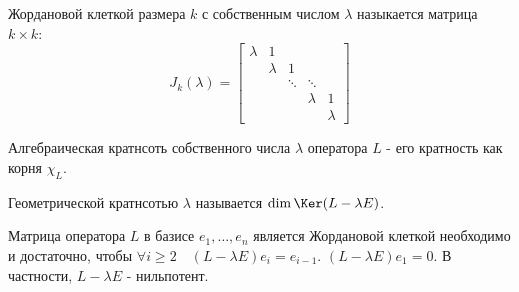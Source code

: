 \begin{definition} \thmslashn 

    Жордановой клеткой размера $k$ с собственным числом $\lambda$ назыкается матрица $k \times k$:
    \begin{equation*}
        J_{k}(\lambda) =
        \begin{bmatrix}
            \lambda & 1 & & &\\
              & \lambda & 1 & &\\
              &   & \ddots & \ddots &\\
              &   &   & \lambda & 1\\
              &   &   &   & \lambda
        \end{bmatrix} 
    \end{equation*}
\end{definition}
\begin{definition} \thmslashn 

    Алгебраическая кратнсоть собственного числа $\lambda$ оператора $L$ - его кратность как корня $\chi_{L}$.

    Геометрической кратнсотью $\lambda$ называется $\dim \Ker (L - \lambda E)$. 
\end{definition}
\begin{lemma} \thmslashn

    Матрица оператора $L$ в базисе $e_1, \ldots, e_{n}$ является Жордановой клеткой необходимо и достаточно, чтобы $\forall{ i \ge 2}\quad (L - \lambda E)e_{i} = e_{i-1}$. $(L - \lambda E)e_1 = 0$. В частности, $L - \lambda E$ - нильпотент.
\end{lemma}
